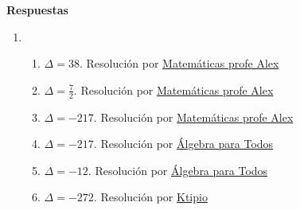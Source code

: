 \documentclass[a4paper]{article}
\newcommand{\exercise}{\item}
\begin{document}
\vspace{20pt} 
 \textbf{Respuestas}\begin{enumerate}\exercise\begin{enumerate} [label=(\alph*)]		\item $\Delta=38$. Resolución por \href{https://youtu.be/bsUUVmeqsdY?t=104}{Matemáticas profe Alex}
		\item $\Delta=\frac{7}{2}$. Resolución por \href{https://youtu.be/bsUUVmeqsdY?t=237}{Matemáticas profe Alex}
		\item $\Delta=-217$. Resolución por \href{https://youtu.be/8OnOZvc5rFQ}{Matemáticas profe Alex}
		\item $\Delta=-217$. Resolución por \href{https://youtu.be/0iXeaZwPkzo}{Álgebra para Todos}
		\item $\Delta=-12$. Resolución por \href{https://youtu.be/qDyeSvFMbTg}{Álgebra para Todos}
		\item $\Delta=-272$. Resolución por \href{https://youtu.be/fPIaDQ8TOs0}{Ktipio}
\end{enumerate}\end{enumerate}
\end{document}
